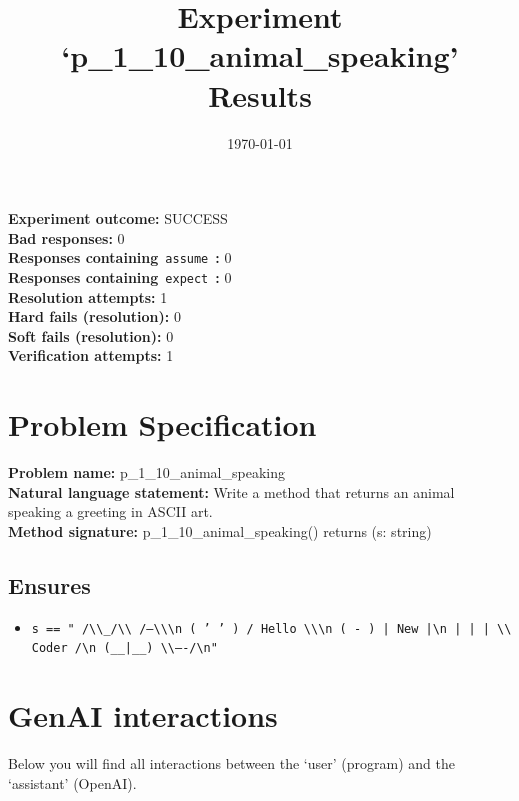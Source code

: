 \documentclass{article}
\begin{document}
\title{Experiment `p\_1\_10\_animal\_speaking' Results}
\author{\today}
\date{}
\maketitle
\textbf{Experiment outcome: }SUCCESS
\\\textbf{Bad responses: }0
\\\textbf{Responses containing}~\texttt{assume}~\textbf{: }0
\\\textbf{Responses containing}~\texttt{expect}~\textbf{: }0
\\\textbf{Resolution attempts: }1
\\\textbf{Hard fails (resolution): }0
\\\textbf{Soft fails (resolution): }0
\\\textbf{Verification attempts: }1
\section*{Problem Specification}
\textbf{Problem name: }p\_1\_10\_animal\_speaking
\\\textbf{Natural language statement: }Write a method that returns an animal speaking a greeting in ASCII art.
\\\textbf{Method signature: }p\_1\_10\_animal\_speaking() returns (s: string)
\subsection*{Ensures}
\begin{itemize}
\item \texttt{s == "  /\textbackslash{}\textbackslash{}\_/\textbackslash{}\textbackslash{}     /---\textbackslash{}\textbackslash{}\textbackslash{}n ( ' ' )  / Hello \textbackslash{}\textbackslash{}\textbackslash{}n (  -  )  |  New  |\textbackslash{}n  | | |   \textbackslash{}\textbackslash{} Coder /\textbackslash{}n (\_\_|\_\_)    \textbackslash{}\textbackslash{}----/\textbackslash{}n"}
\end{itemize}
\clearpage
\section*{GenAI interactions}
Below you will find all interactions between the `user' (program) and the `assistant' (OpenAI).
\end{document}
